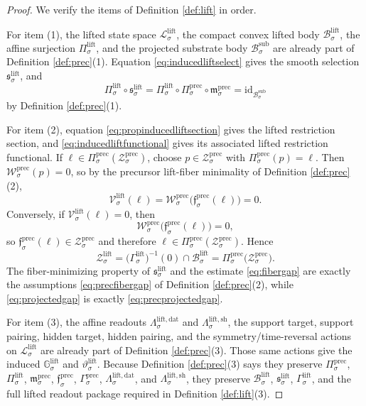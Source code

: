 \documentclass[11pt]{article}
\newcommand{\SubBody}[1]{\mathcal B_{#1}^{\mathrm{sub}}}
\newcommand{\LiftSpace}[1]{\mathcal L_{#1}^{\mathrm{lift}}}
\newcommand{\LiftBody}[1]{\mathcal B_{#1}^{\mathrm{lift}}}
\newcommand{\LiftProj}[1]{\Pi_{#1}^{\mathrm{lift}}}
\newcommand{\LiftSelect}[1]{\mathfrak s_{#1}^{\mathrm{lift}}}
\newcommand{\LiftSection}[1]{\Gamma_{#1}^{\mathrm{lift}}}
\newcommand{\LiftFunctional}[1]{\mathscr V_{#1}^{\mathrm{lift}}}
\newcommand{\LiftData}[1]{\Lambda_{#1}^{\mathrm{lift,dat}}}
\newcommand{\LiftShellMap}[1]{\Lambda_{#1}^{\mathrm{lift,sh}}}
\newcommand{\LiftSym}[1]{\mathbb G_{#1}^{\mathrm{lift}}}
\newcommand{\LiftTime}[1]{\vartheta_{#1}^{\mathrm{lift}}}
\newcommand{\LiftShellSet}[1]{\mathcal Z_{#1}^{\mathrm{lift}}}
\newcommand{\PrecProj}[1]{\Pi_{#1}^{\mathrm{prec}}}
\newcommand{\PrecLiftMin}[1]{\mathfrak f_{#1}^{\mathrm{prec}}}
\newcommand{\PrecSubMin}[1]{\mathfrak m_{#1}^{\mathrm{prec}}}
\newcommand{\PrecSection}[1]{\Gamma_{#1}^{\mathrm{prec}}}
\newcommand{\PrecFunctional}[1]{\mathscr W_{#1}^{\mathrm{prec}}}
\newcommand{\PrecShellSet}[1]{\mathcal Z_{#1}^{\mathrm{prec}}}
\begin{document}
\begin{proof}
We verify the items of Definition \ref{def:lift} in order.

For item (1), the lifted state space \(\LiftSpace{\sigma}\), the compact convex lifted body \(\LiftBody{\sigma}\), the affine surjection \(\LiftProj{\sigma}\), and the projected substrate body \(\SubBody{\sigma}\) are already part of Definition \ref{def:prec}(1). Equation \eqref{eq:inducedliftselect} gives the smooth selection \(\LiftSelect{\sigma}\), and
\[
\LiftProj{\sigma}\circ\LiftSelect{\sigma}
=
\LiftProj{\sigma}\circ\PrecProj{\sigma}\circ\PrecSubMin{\sigma}
=
\mathrm{id}_{\SubBody{\sigma}}
\]
by Definition \ref{def:prec}(1).

For item (2), equation \eqref{eq:propinducedliftsection} gives the lifted restriction section, and \eqref{eq:inducedliftfunctional} gives its associated lifted restriction functional. If \(\ell\in\PrecProj{\sigma}(\PrecShellSet{\sigma})\), choose \(p\in\PrecShellSet{\sigma}\) with \(\PrecProj{\sigma}(p)=\ell\). Then \(\PrecFunctional{\sigma}(p)=0\), so by the precursor lift-fiber minimality of Definition \ref{def:prec}(2),
\[
\LiftFunctional{\sigma}(\ell)
=
\PrecFunctional{\sigma}\bigl(\PrecLiftMin{\sigma}(\ell)\bigr)
=0.
\]
Conversely, if \(\LiftFunctional{\sigma}(\ell)=0\), then
\[
\PrecFunctional{\sigma}\bigl(\PrecLiftMin{\sigma}(\ell)\bigr)=0,
\]
so \(\PrecLiftMin{\sigma}(\ell)\in\PrecShellSet{\sigma}\) and therefore \(\ell\in\PrecProj{\sigma}(\PrecShellSet{\sigma})\). Hence
\[
\LiftShellSet{\sigma}
=
\bigl(\LiftSection{\sigma}\bigr)^{-1}(0)\cap\LiftBody{\sigma}
=
\PrecProj{\sigma}\bigl(\PrecShellSet{\sigma}\bigr).
\]
The fiber-minimizing property of \(\LiftSelect{\sigma}\) and the estimate \eqref{eq:fibergap} are exactly the assumptions \eqref{eq:precfibergap} of Definition \ref{def:prec}(2), while \eqref{eq:projectedgap} is exactly \eqref{eq:precprojectedgap}.

For item (3), the affine readouts \(\LiftData{\sigma}\) and \(\LiftShellMap{\sigma}\), the support target, support pairing, hidden target, hidden pairing, and the symmetry/time-reversal actions on \(\LiftSpace{\sigma}\) are already part of Definition \ref{def:prec}(3). Those same actions give the induced \(\LiftSym{\sigma}\) and \(\LiftTime{\sigma}\). Because Definition \ref{def:prec}(3) says they preserve \(\PrecProj{\sigma}\), \(\LiftProj{\sigma}\), \(\PrecSubMin{\sigma}\), \(\PrecLiftMin{\sigma}\), \(\PrecSection{\sigma}\), \(\LiftData{\sigma}\), and \(\LiftShellMap{\sigma}\), they preserve \(\LiftBody{\sigma}\), \(\LiftSelect{\sigma}\), \(\LiftSection{\sigma}\), and the full lifted readout package required in Definition \ref{def:lift}(3).


\end{proof}
\end{document}
